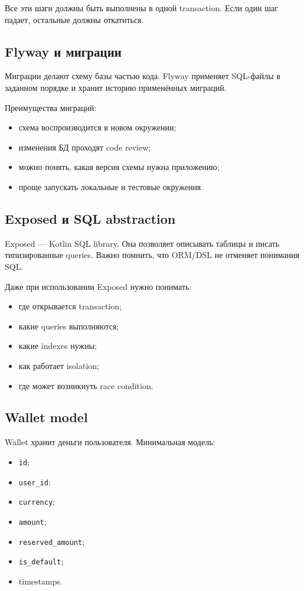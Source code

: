 \documentclass[12pt,a4paper]{article}
\begin{document}
Все эти шаги должны быть выполнены в одной transaction. Если один шаг падает,
остальные должны откатиться.

\subsection{Flyway и миграции}

Миграции делают схему базы частью кода. Flyway применяет SQL-файлы в заданном
порядке и хранит историю применённых миграций.

Преимущества миграций:
\begin{itemize}
    \item схема воспроизводится в новом окружении;
    \item изменения БД проходят code review;
    \item можно понять, какая версия схемы нужна приложению;
    \item проще запускать локальные и тестовые окружения.
\end{itemize}

\subsection{Exposed и SQL abstraction}

Exposed --- Kotlin SQL library. Она позволяет описывать таблицы и писать
типизированные queries. Важно помнить, что ORM/DSL не отменяет понимания SQL.

Даже при использовании Exposed нужно понимать:
\begin{itemize}
    \item где открывается transaction;
    \item какие queries выполняются;
    \item какие indexes нужны;
    \item как работает isolation;
    \item где может возникнуть race condition.
\end{itemize}

\subsection{Wallet model}

Wallet хранит деньги пользователя. Минимальная модель:
\begin{itemize}
    \item \texttt{id};
    \item \texttt{user\_id};
    \item \texttt{currency};
    \item \texttt{amount};
    \item \texttt{reserved\_amount};
    \item \texttt{is\_default};
    \item timestamps.
\end{itemize}
\end{document}
